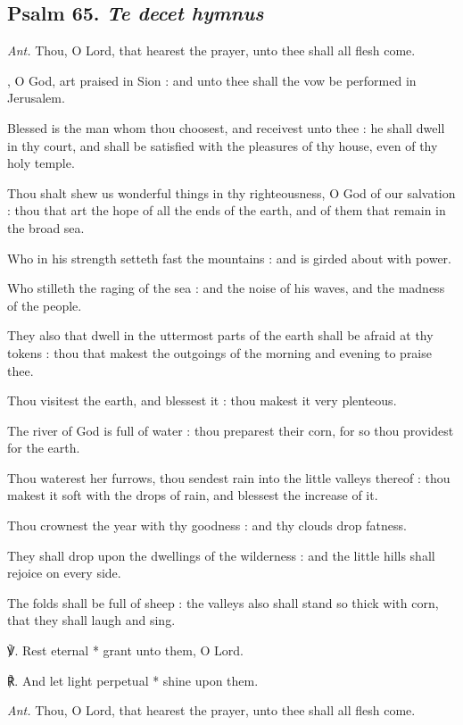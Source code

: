 \subsection{Psalm 65. \textit{Te decet hymnus}}\par\noindent
\textit{Ant.} Thou, O Lord, {\dag} that hearest the prayer, unto thee shall all flesh come.\par
{}, O God, art praised in Sion : and unto thee shall the vow be performed in Jerusalem.\par
{}
Blessed is the man whom thou choosest, and receivest unto thee : he shall dwell in thy court, and shall be satisfied with the pleasures of thy house, even of thy holy temple.\par
{}Thou shalt shew us wonderful things in thy righteousness, O God of our salvation : thou that art the hope of all the ends of the earth, and of them that remain in the broad sea.\par
{}Who in his strength setteth fast the mountains : and is girded about with power.\par
{}Who stilleth the raging of the sea : and the noise of his waves, and the madness of the people.\par
{}They also that dwell in the uttermost parts of the earth shall be afraid at thy tokens : thou that makest the outgoings of the morning and evening to praise thee.\par
{}Thou visitest the earth, and blessest it : thou makest it very plenteous.\par
{}The river of God is full of water : thou preparest their corn, for so thou providest for the earth.\par
{}Thou waterest her furrows, thou sendest rain into the little valleys thereof : thou makest it soft with the drops of rain, and blessest the increase of it.\par
{}Thou crownest the year with thy goodness : and thy clouds drop fatness.\par
{}They shall drop upon the dwellings of the wilderness : and the little hills shall rejoice on every side.\par
{}The folds shall be full of sheep : the valleys also shall stand so thick with corn, that they shall laugh and sing.\par
℣. Rest eternal * grant unto them, O Lord.\par
℟. And let light perpetual * shine upon them.\par\noindent
\textit{Ant.} Thou, O Lord, that hearest the prayer, unto thee shall all flesh come.

